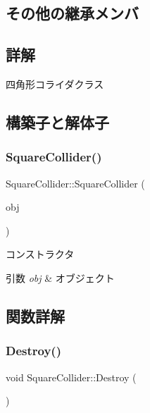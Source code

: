 \subsection*{その他の継承メンバ}


\subsection{詳解}
四角形コライダクラス 

\subsection{構築子と解体子}
\mbox{\label{class_square_collider_a002cb3de9da3aa637d46c0819449c31c}} 
\subsubsection{\texorpdfstring{Square\+Collider()}{SquareCollider()}}
{\footnotesize\ttfamily Square\+Collider\+::\+Square\+Collider (\begin{DoxyParamCaption}\item[{\mbox{\hyperlink{class_object_base}{Object\+Base}} $\ast$}]{obj }\end{DoxyParamCaption})}



コンストラクタ 


\begin{DoxyParams}{引数}
{\em obj} & オブジェクト \\
\hline
\end{DoxyParams}


\subsection{関数詳解}
\mbox{\label{class_square_collider_a83273e0e63692aa8020b8deedd456886}} 
\subsubsection{\texorpdfstring{Destroy()}{Destroy()}}
{\footnotesize\ttfamily void Square\+Collider\+::\+Destroy (\begin{DoxyParamCaption}{ }\end{DoxyParamCaption})}



